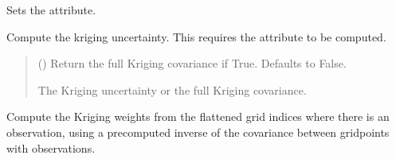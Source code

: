 \documentclass[letterpaper,10pt,english]{sphinxmanual}
\begin{document}
\begin{fulllineitems}
\begin{fulllineitems}
\sphinxAtStartPar
Sets the  attribute.
\begin{quote}\begin{description}
\sphinxAtStartPar
{}

\end{description}\end{quote}

\end{fulllineitems}


\begin{fulllineitems}
\label{\detokenize{kriging:glomar_gridding.kriging.SimpleKriging.get_uncertainty}}
\pysigstartsignatures
\pysiglinewithargsret
{}
{}
{}
\pysigstopsignatures
\sphinxAtStartPar
Compute the kriging uncertainty. This requires the attribute
 to be computed.
\begin{quote}\begin{description}
\sphinxAtStartPar
{} () \textendash{} Return the full Kriging covariance if True. Defaults to False.

\sphinxAtStartPar
{} \textendash{} The Kriging uncertainty or the full Kriging covariance.

\sphinxAtStartPar
{}

\end{description}\end{quote}

\end{fulllineitems}


\begin{fulllineitems}
\label{\detokenize{kriging:glomar_gridding.kriging.SimpleKriging.kriging_weights_from_inverse}}
\pysigstartsignatures
\pysiglinewithargsret
{}
{}
{}
\pysigstopsignatures
\sphinxAtStartPar
Compute the Kriging weights from the flattened grid indices where
there is an observation, using a pre\sphinxhyphen{}computed inverse of the covariance
between grid\sphinxhyphen{}points with observations.


\end{fulllineitems}
\end{fulllineitems}
\end{document}
